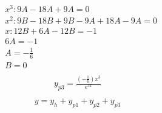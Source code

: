 \documentclass{article}
\begin{document}
    \begin{align*}
        &x^{3}: 9A -18A + 9A = 0\\
        &x^{2}: 9B - 18B + 9B -9A + 18A - 9A = 0\\
        &x: 12B + 6A - 12B = -1\\
        &6A = -1\\
        &A = -\frac{1}{6}\\
        &B = 0 \\
    \end{align*}
    \begin{align*}
        y_{p3} = \frac{(-\frac{1}{6})x^{3}}{e^{3x}}\\
    \end{align*}
    \begin{align*}
        y = y_{h} + y_{p1} + y_{p2} + y_{p3} \\
    \end{align*}


    \newpage
\end{document}
